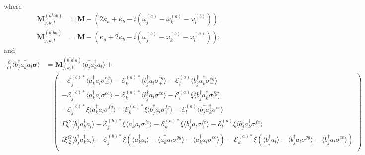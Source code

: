 \documentclass{article}
\newcommand{\ddt}[1][]{\frac{\mathrm{d} #1}{\mathrm{d}t}}
\begin{document}
where
\begin{subequations}
	\begin{align}
		\bm{M}_{j, k, l}^{(a^{\dagger} a b)} &= \bm{M} - \left( 2 \kappa_{a} + \kappa_{b} - i \left( \omega_{j}^{(a)} - \omega_{k}^{(a)} - \omega_{l}^{(b)} \right) \right), \\
		\bm{M}_{j, k, l}^{(b^{\dagger} b a)} &= \bm{M} - \left( \kappa_{a} + 2 \kappa_{b} - i \left( \omega_{j}^{(b)} - \omega_{k}^{(b)} - \omega_{l}^{(a)} \right) \right) ;
	\end{align}
\end{subequations}
and
\begin{subequations}
	\begin{align}
		\ddt \langle b^{\dagger}_{j} a^{\dagger}_{k} a_{l} \bm{\sigma} \rangle &= \bm{M}_{j, k, l}^{(b^{\dagger} a^{\dagger} a)} \langle b^{\dagger}_{j} a^{\dagger}_{k} a_{l} \rangle + \nonumber \\
		&\quad
		\begin{pmatrix}
			-\mathcal{E}_{j}^{(b) *} \langle a^{\dagger}_{k} a_{l} \sigma^{eg}_{+} \rangle - \mathcal{E}_{k}^{(a) *} \langle b^{\dagger}_{j} a_{l} \sigma^{eg}_{+} \rangle - \mathcal{E}_{l}^{(a)} \langle b^{\dagger}_{j} a^{\dagger}_{k} \sigma^{eg}_{-} \rangle \\
			-\mathcal{E}_{j}^{(b) *} \langle a^{\dagger}_{k} a_{l} \sigma^{ee} \rangle - \mathcal{E}_{k}^{(a) *} \langle b^{\dagger}_{j} a_{l} \sigma^{ee} \rangle - \mathcal{E}_{l}^{(a)} \xi \langle b^{\dagger}_{j} a^{\dagger}_{k} \sigma^{fg}_{-} \rangle \\
			-\mathcal{E}_{j}^{(b) *} \xi \langle a^{\dagger}_{k} a_{l} \sigma^{fg}_{+} \rangle - \mathcal{E}_{k}^{(a) *} \xi \langle b^{\dagger}_{j} a_{l} \sigma^{fg}_{+} \rangle - \mathcal{E}_{l}^{(a)} \langle b^{\dagger}_{j} a^{\dagger}_{k} \sigma^{ee} \rangle \\
			\Gamma \xi^{2} \langle b^{\dagger}_{j} a^{\dagger}_{k} a_{l} \rangle - \mathcal{E}_{j}^{(b) *} \xi \langle a^{\dagger}_{k} a_{l} \sigma^{fe}_{+} \rangle - \mathcal{E}_{k}^{(a) *} \xi \langle b^{\dagger}_{j} a_{l} \sigma^{fe}_{+} \rangle  - \mathcal{E}_{l}^{(a)} \xi \langle b^{\dagger}_{j} a^{\dagger}_{k} \sigma^{fe}_{-} \rangle\\
			i \xi \frac{\Omega}{2} \langle b^{\dagger}_{j} a^{\dagger}_{k} a_{l} \rangle - \mathcal{E}_{j}^{(b) *} \xi \left( \langle a^{\dagger}_{k} a_{l} \rangle - \langle a^{\dagger}_{k} a_{l} \sigma^{gg} \rangle - \langle a^{\dagger}_{k} a_{l} \sigma^{ee} \rangle \right)  - \mathcal{E}_{k}^{(a) *} \xi \left( \langle b^{\dagger}_{j} a_{l} \rangle - \langle b^{\dagger}_{j} a_{l} \sigma^{gg} \rangle - \langle b^{\dagger}_{j} a_{l} \sigma^{ee} \rangle \right) \\

\end{pmatrix}
\end{align}
\end{subequations}
\end{document}
